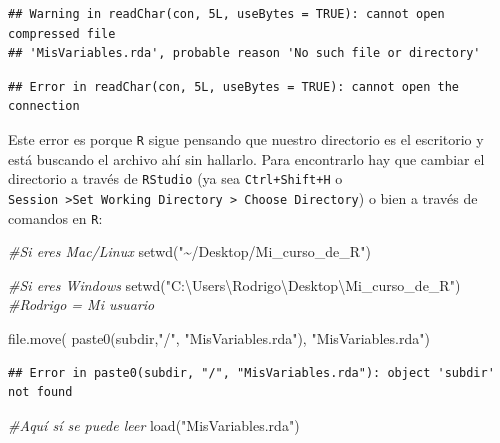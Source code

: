 \documentclass[]{tufte-book}
\newenvironment{Shaded}{}{}
\newcommand{\CommentTok}[1]{\textcolor[rgb]{0.38,0.63,0.69}{\textit{#1}}}
\newcommand{\FunctionTok}[1]{\textcolor[rgb]{0.02,0.16,0.49}{#1}}
\newcommand{\NormalTok}[1]{#1}
\newcommand{\StringTok}[1]{\textcolor[rgb]{0.25,0.44,0.63}{#1}}
\begin{document}
\begin{verbatim}
## Warning in readChar(con, 5L, useBytes = TRUE): cannot open compressed file
## 'MisVariables.rda', probable reason 'No such file or directory'
\end{verbatim}

\begin{verbatim}
## Error in readChar(con, 5L, useBytes = TRUE): cannot open the connection
\end{verbatim}

Este error es porque \texttt{R} sigue pensando que nuestro directorio es
el escritorio y está buscando el archivo ahí sin hallarlo. Para
encontrarlo hay que cambiar el directorio a través de \texttt{RStudio}
(ya sea \texttt{Ctrl+Shift+H} o
\texttt{Session\ \textgreater{}Set\ Working\ Directory\ \textgreater{}\ Choose\ Directory})
o bien a través de comandos en \texttt{R}:

\begin{Shaded}
\begin{Highlighting}[]
\CommentTok{\#Si eres Mac/Linux}
\FunctionTok{setwd}\NormalTok{(}\StringTok{"\textasciitilde{}/Desktop/Mi\_curso\_de\_R"}\NormalTok{) }

\CommentTok{\#Si eres Windows}
\FunctionTok{setwd}\NormalTok{(}\StringTok{"C:\textbackslash{}Users\textbackslash{}Rodrigo\textbackslash{}Desktop\textbackslash{}Mi\_curso\_de\_R"}\NormalTok{) }\CommentTok{\#Rodrigo = Mi usuario}
\end{Highlighting}
\end{Shaded}

\begin{Shaded}
\begin{Highlighting}[]
\FunctionTok{file.move}\NormalTok{( }\FunctionTok{paste0}\NormalTok{(subdir,}\StringTok{"/"}\NormalTok{, }\StringTok{"MisVariables.rda"}\NormalTok{), }\StringTok{"MisVariables.rda"}\NormalTok{)}
\end{Highlighting}
\end{Shaded}

\begin{verbatim}
## Error in paste0(subdir, "/", "MisVariables.rda"): object 'subdir' not found
\end{verbatim}

\begin{Shaded}
\begin{Highlighting}[]
\CommentTok{\#Aquí sí se puede leer}
\FunctionTok{load}\NormalTok{(}\StringTok{"MisVariables.rda"}\NormalTok{)}
\end{Highlighting}
\end{Shaded}
\end{document}
